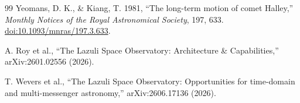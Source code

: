 \begin{thebibliography}{99}
Yeomans, D. K., \& Kiang, T. 1981,
``The long-term motion of comet Halley,''
\textit{Monthly Notices of the Royal Astronomical Society}, 197, 633.
\href{https://doi.org/10.1093/mnras/197.3.633}{doi:10.1093/mnras/197.3.633}.

A. Roy et al., ``The Lazuli Space Observatory: Architecture \& Capabilities,''
arXiv:2601.02556 (2026).

T. Wevers et al., ``The Lazuli Space Observatory: Opportunities for time-domain
and multi-messenger astronomy,'' arXiv:2606.17136 (2026).

\end{thebibliography}


\appendixCfinish
